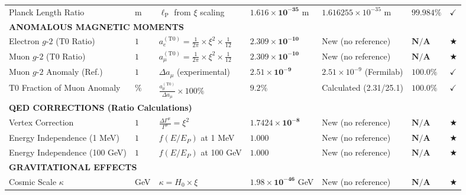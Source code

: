 \documentclass[12pt,a4paper]{article}
\newcommand{\xipar}{\xi}
\newcommand{\ellP}{\ell_{\mathrm{P}}}
\newcommand{\gfactor}{g\text{-}2}
\newcommand{\aelectron}{a_e^{(\mathrm{T0})}}
\newcommand{\amuon}{a_{\mu}^{(\mathrm{T0})}}
\newcommand{\DeltaGamma}{\Delta\Gamma^{\mu}}
\newcommand{\Hubble}{H_0}
\newcommand{\kappaP}{\kappa}
\newcommand{\checked}{\checkmark}
\begin{document}
\begin{landscape}
\begin{longtable}{p{5.8cm}p{2cm}p{4.2cm}p{3.8cm}p{3.8cm}p{2.0cm}p{1cm}}
			Planck Length Ratio & m & $\ellP$ from $\xipar$ scaling & $\mathbf{1.616 \times 10^{-35}}$ m & $1.616255 \times 10^{-35}$ m & $\mathbf{99.984\%}$ & $\checked$ \\
			
			\multicolumn{7}{l}{\textbf{ANOMALOUS MAGNETIC MOMENTS}} \\
			\midrule
			Electron $\gfactor$ (T0 Ratio) & $1$ & $\aelectron = \frac{1}{2\pi} \times \xipar^2 \times \frac{1}{12}$ & $\mathbf{2.309 \times 10^{-10}}$ & New (no reference) & $\mathbf{N/A}$ & $\bigstar$ \\
			
			Muon $\gfactor$ (T0 Ratio) & $1$ & $\amuon = \frac{1}{2\pi} \times \xipar^2 \times \frac{1}{12}$ & $\mathbf{2.309 \times 10^{-10}}$ & New (no reference) & $\mathbf{N/A}$ & $\bigstar$ \\
			
			Muon $\gfactor$ Anomaly (Ref.) & $1$ & $\Delta a_{\mu}$ (experimental) & $\mathbf{2.51 \times 10^{-9}}$ & $2.51 \times 10^{-9}$ (Fermilab) & $\mathbf{100.0\%}$ & $\checked$ \\
			
			T0 Fraction of Muon Anomaly & $\%$ & $\frac{a_{\mu}^{(\text{T0})}}{\Delta a_{\mu}} \times 100\%$ & $\mathbf{9.2\%}$ & Calculated (2.31/25.1) & $\mathbf{100.0\%}$ & $\checked$ \\
			
			\multicolumn{7}{l}{\textbf{QED CORRECTIONS (Ratio Calculations)}} \\
			\midrule
			Vertex Correction & $1$ & $\frac{\DeltaGamma}{\Gamma^{\mu}} = \xipar^2$ & $\mathbf{1.7424 \times 10^{-8}}$ & New (no reference) & $\mathbf{N/A}$ & $\bigstar$ \\
			
			Energy Independence (1 MeV) & $1$ & $f(E/E_P)$ at 1 MeV & $\mathbf{1.000}$ & New (no reference) & $\mathbf{N/A}$ & $\bigstar$ \\
			
			Energy Independence (100 GeV) & $1$ & $f(E/E_P)$ at 100 GeV & $\mathbf{1.000}$ & New (no reference) & $\mathbf{N/A}$ & $\bigstar$ \\
			
			\multicolumn{7}{l}{\textbf{GRAVITATIONAL EFFECTS}} \\
			\midrule
			Cosmic Scale $\kappaP$ & GeV & $\kappaP = \Hubble \times \xipar$ & $\mathbf{1.98 \times 10^{-46}}$ GeV & New (no reference) & $\mathbf{N/A}$ & $\bigstar$ \\
			

\end{longtable}
\end{landscape}
\end{document}
